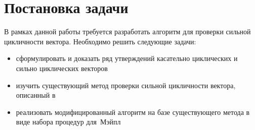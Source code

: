 \section{Постановка задачи}

В рамках данной работы требуется разработать алгоритм для проверки сильной цикличности вектора.
Необходимо решить следующие задачи:
\begin{itemize}
    \item сформулировать и доказать ряд утверждений касательно циклических и сильно циклических векторов
    \item изучить существующий метод проверки сильной цикличности вектора, описанный в~\cite{litPanferov}
    \item реализовать модифицированный алгоритм на базе существующего метода в виде набора процедур для~Мэйпл
\end{itemize}
